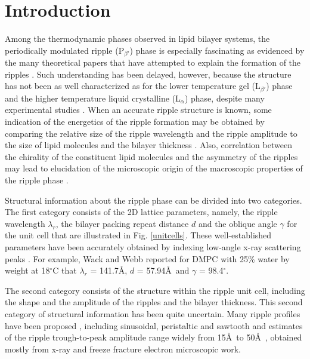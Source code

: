 \section{Introduction}
\label{rppl_intro}

Among the thermodynamic phases observed in
lipid bilayer systems, the periodically modulated ripple (P$_{\beta '}$) phase
is especially fascinating as evidenced by the many theoretical papers that
have attempted to explain the formation of the ripples
\cite{Don79,Mar84,Haw86,Car87,Gol88,McCu90,Hon91,Lub93}. 
Such understanding has been delayed, however, because the structure has
not been as well characterized as for the lower temperature gel
(L$_{\beta '}$) phase and the higher temperature liquid crystalline
(L$_{\alpha}$) phase, despite many experimental studies 
\cite{Tar73,JanSS79,Luna77,Ino80,Cop80,Sta82,Rup83,Ale85,Sir88,%
Wac89a,Kat95}.  When an accurate ripple
structure is known, some indication of the energetics of the ripple formation
may be obtained by comparing the relative size of the ripple
wavelength and the ripple amplitude to the size of lipid molecules and
the bilayer thickness \cite{Gol88}.  Also, correlation 
between the chirality of the constituent lipid molecules and the asymmetry of 
the ripples may lead to elucidation of the microscopic origin 
of the macroscopic properties of the ripple phase \cite{Lub93,Kat95}.

Structural information about the ripple phase can be divided into two
categories. The first category consists of the 2D lattice parameters, namely, 
the ripple wavelength $\lambda_r$, the bilayer packing repeat distance $d$ and
the oblique angle $\gamma$ for the unit cell that are illustrated
in Fig. \ref{unitcells}.  These well-established parameters have been 
accurately obtained by indexing low-angle x-ray scattering peaks
\cite{Tar73,JanSS79,Ino80,Ale85,Wac89a}. 
For example, Wack and Webb \cite{Wac89a} reported for DMPC with
25\% water by weight at 18$^{\circ}$C that $\lambda_r$ = 141.7\AA, 
$d$ = 57.94\AA\ and $\gamma$ = 98.4$^{\circ}$.

The second category
consists of the structure within the ripple unit cell, including
the shape and the amplitude of the ripples and the bilayer thickness. 
This second category of structural information
has been quite uncertain.  Many ripple profiles have been 
proposed \cite{Don79,Mar84,Car87,Gol88,McCu90,Hon91,Lub93,Tar73,JanSS79,Sta82},
including sinusoidal, peristaltic and sawtooth and
estimates of the ripple trough-to-peak 
amplitude range widely from 15\AA\ to 50\AA\ 
\cite{Tar73,JanSS79,Sta82,Zas88a,Hata93}, obtained mostly from 
x-ray and freeze fracture electron microscopic work.

